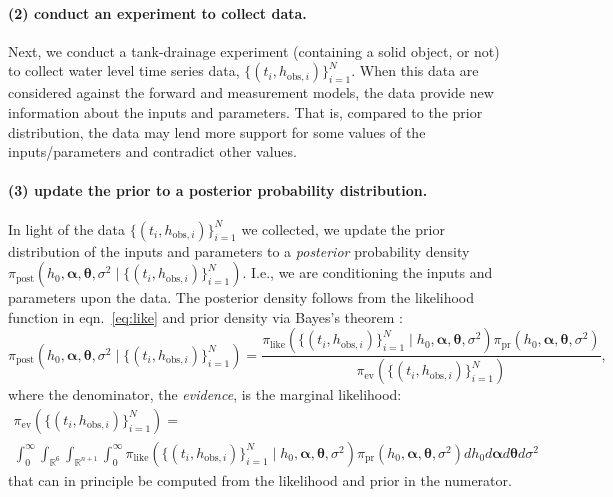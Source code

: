 \documentclass[openacc]{rsproca_new}%
\newcommand\thedata {$\{(t_i,h_{\text{obs}, i})\}_{i=1}^{N}$\xspace}
\newcommand\thedatanomath {\{(t_i,h_{\text{obs}, i})\}_{i=1}^{N}}
\begin{document}
\vspace{-\baselineskip}
\paragraph{(2) conduct an experiment to collect data.}
Next, we conduct a tank-drainage experiment (containing a solid object, or not) to collect water level time series data, \thedata. 
When this data are considered against the forward and measurement models, the data provide new information about the inputs and parameters. 
That is, compared to the prior distribution, the data may lend more support for some values of the inputs/parameters and contradict other values.

\vspace{-\baselineskip}
\paragraph{(3) update the prior to a posterior probability distribution.}
In light of the data \thedata we collected, we update the prior distribution of the inputs and parameters to a \emph{posterior} probability density $\pi_{\text{post}}(h_0, \boldsymbol \alpha, \boldsymbol \theta, \sigma^2 \mid \thedatanomath)$. I.e., we are conditioning the inputs and parameters upon the data.
The posterior density follows from the likelihood function in eqn.~\ref{eq:like} and prior density via Bayes's theorem \cite{van2021bayesian,calvetti2018inverse}:
\begin{equation}
	\pi_{\text{post}}(h_0, \boldsymbol \alpha, \boldsymbol \theta, \sigma^2 \mid \thedatanomath) = \frac{
	\pi_{\text{like}}(\thedatanomath \mid h_0,  \boldsymbol \alpha, \boldsymbol \theta, \sigma^2 ) 
	\pi_{\text{pr}}(h_0, \boldsymbol\alpha, \boldsymbol \theta, \sigma^2)
	}{
	\pi_{\text{ev}}(\thedatanomath) 
	}, \label{eq:post}
\end{equation} where the denominator, the \emph{evidence}, is the marginal likelihood:
\begin{multline}
    \pi_{\text{ev}}(\thedatanomath) = \\ 
    \int_0^\infty
     \int_{\mathbb{R}^6}  
     \int_{\mathbb{R}^{n+1}} 
     \int_0^\infty 
    \pi_{\text{like}}(\thedatanomath \mid h_0,  \boldsymbol \alpha, \boldsymbol \theta, \sigma^2 ) 
	\pi_{\text{pr}}(h_0, \boldsymbol\alpha, \boldsymbol \theta, \sigma^2)
	dh_0 d \boldsymbol\alpha d \boldsymbol\theta d\sigma^2 \label{eq:ev}
\end{multline}
that can in principle be computed from the likelihood and prior in the numerator. 
\end{document}
